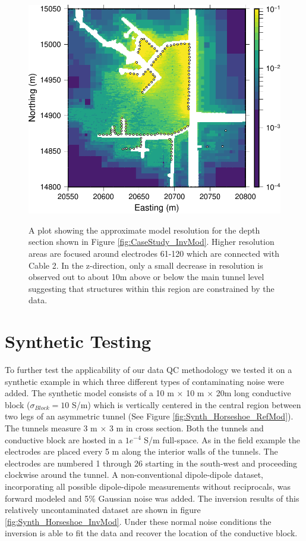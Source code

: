\documentclass[final,authoryear,5p,times,twocolumn]{elsarticle}
\begin{document}
\begin{figure} [!ht]
    \begin{center}
       \label{fig:ModRes_CableSplitCombined_Final_z2586}
       \includegraphics[trim=0cm 0cm 0cm 0cm, clip=true,width=0.95\linewidth]{./Figures/Fig19.pdf} 
    \end{center}
\caption{A plot showing the approximate model resolution for the depth section shown in Figure \ref{fig:CaseStudy_InvMod}. Higher resolution areas are focused around electrodes 61-120 which are connected with Cable 2. In the z-direction, only a small decrease in resolution is observed out to about 10m above or below the main tunnel level suggesting that structures within this region are constrained by the data.}
\label{fig:ModRes_CableSplitCombined_Final}
\end{figure}  
 
\section{Synthetic Testing}
\label{Synthetic_Testing}

To further test the applicability of our data QC methodology we tested it on a synthetic example in which three different types of contaminating noise were added. The synthetic model consists of a 10 m $\times$ 10 m $\times$ 20m long conductive block ($\sigma_{Block}= 10$ S/m) which is vertically centered in the central region between two legs of an asymmetric tunnel (See Figure \ref{fig:Synth_Horseshoe_RefMod}). The tunnels measure 3 m $\times$ 3 m in cross section. Both the tunnels and conductive block are hosted in a $1e^{-4}$ S/m full-space. As in the field example the electrodes are placed every 5 m along the interior walls of the tunnels. The electrodes are numbered 1 through 26 starting in the south-west and proceeding clockwise around the tunnel. A non-conventional dipole-dipole dataset, incorporating all possible dipole-dipole measurements without reciprocals, was forward modeled and 5\% Gaussian noise was added. The inversion results of this relatively uncontaminated dataset are shown in figure \ref{fig:Synth_Horseshoe_InvMod}. Under these normal noise conditions the inversion is able to fit the data and recover the location of the conductive block.  
\end{document}
